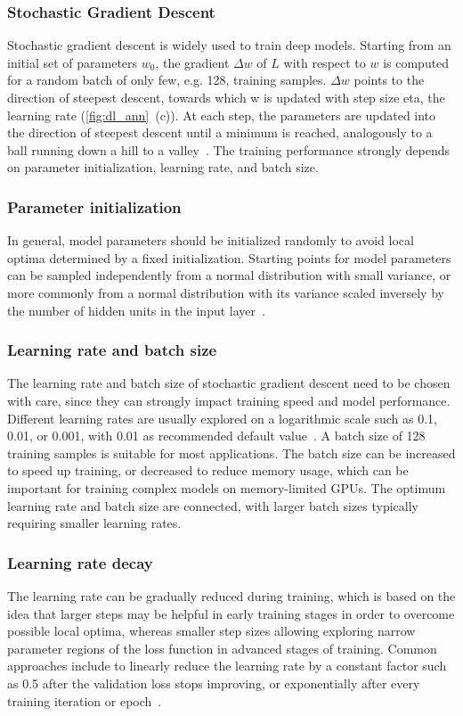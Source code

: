 \subsubsection{Stochastic Gradient Descent}
Stochastic gradient descent is widely used to train deep models. Starting from an initial set of parameters $w_0$, the gradient $\Delta w$ of $L$ with respect to $w$ is computed for a random batch of only few, e.g. 128, training samples. $\Delta w$ points to the direction of steepest descent, towards which w is updated with step size eta, the learning rate (\autoref{fig:dl_ann}~(c)). At each step, the parameters are updated into the direction of steepest descent until a minimum is reached, analogously to a ball running down a hill to a valley~\citep{bengio_practical_2012}. The training performance strongly depends on parameter initialization, learning rate, and batch size.

\subsubsection{Parameter initialization}
In general, model parameters should be initialized randomly to avoid local optima determined by a fixed initialization. Starting points for model parameters can be sampled independently from a normal distribution with small variance, or more commonly from a normal distribution with its variance scaled inversely by the number of hidden units in the input layer~\citep{glorot_understanding_2010,he_delving_2015}.

\subsubsection{Learning rate and batch size}
The learning rate and batch size of stochastic gradient descent need to be chosen with care, since they can strongly impact training speed and model performance. Different learning rates are usually explored on a logarithmic scale such as 0.1, 0.01, or 0.001, with 0.01 as recommended default value~\citep{bengio_practical_2012}. A batch size of 128 training samples is suitable for most applications. The batch size can be increased to speed up training, or decreased to reduce memory usage, which can be important for training complex models on memory-limited GPUs. The optimum learning rate and batch size are connected, with larger batch sizes typically requiring smaller learning rates.

\subsubsection{Learning rate decay}
The learning rate can be gradually reduced during training, which is based on the idea that larger steps may be helpful in early training stages in order to overcome possible local optima, whereas smaller step sizes allowing exploring narrow parameter regions of the loss function in advanced stages of training. Common approaches include to linearly reduce the learning rate by a constant factor such as 0.5 after the validation loss stops improving, or exponentially after every training iteration or epoch~\citep{bengio_practical_2012,gawehn_deep_2016}.

